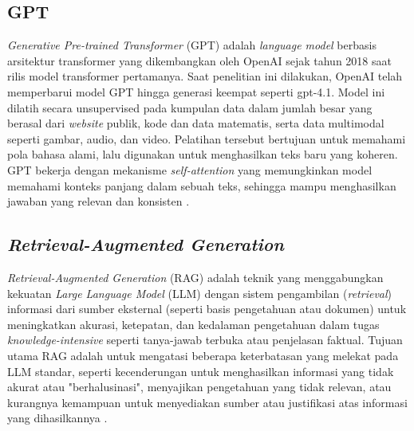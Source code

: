 \subsection{GPT}
\textit{Generative Pre-trained Transformer} (GPT) adalah \textit{language model} berbasis arsitektur transformer yang dikembangkan oleh OpenAI sejak tahun 2018 saat rilis model transformer pertamanya.
Saat penelitian ini dilakukan, OpenAI telah memperbarui model GPT hingga generasi keempat seperti gpt-4.1.
Model ini dilatih secara unsupervised pada kumpulan data dalam jumlah besar yang berasal dari \textit{website} publik, kode dan data matematis, serta data multimodal seperti gambar, audio, dan video.
Pelatihan tersebut bertujuan untuk memahami pola bahasa alami, lalu digunakan untuk menghasilkan teks baru yang koheren.
GPT bekerja dengan mekanisme \textit{self-attention} yang memungkinkan model memahami konteks panjang dalam sebuah teks, sehingga mampu menghasilkan jawaban yang relevan dan konsisten \cite{hurst2024gpt4o}.

\subsection{\textit{Retrieval-Augmented Generation}}
\textit{Retrieval-Augmented Generation} (RAG) adalah teknik yang menggabungkan kekuatan \textit{Large Language Model} (LLM) dengan sistem pengambilan (\textit{retrieval}) informasi dari sumber eksternal (seperti basis pengetahuan atau dokumen) untuk meningkatkan akurasi, ketepatan, dan kedalaman pengetahuan dalam tugas \textit{knowledge-intensive} seperti tanya-jawab terbuka atau penjelasan faktual.
Tujuan utama RAG adalah untuk mengatasi beberapa keterbatasan yang melekat pada LLM standar, seperti kecenderungan untuk menghasilkan informasi yang tidak akurat atau "berhalusinasi", menyajikan pengetahuan yang tidak relevan, atau kurangnya kemampuan untuk menyediakan sumber atau justifikasi atas informasi yang dihasilkannya \cite{Lewis2021RAGKnowledgeIntensiveNLP}.


